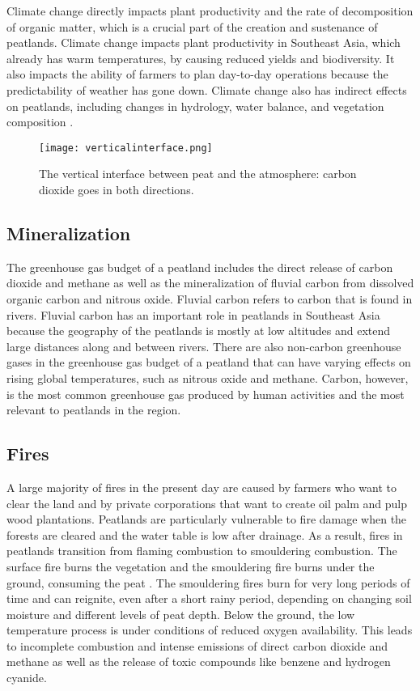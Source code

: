 Climate change directly impacts plant productivity and the rate of decomposition of organic matter, which is a crucial part of the creation and sustenance of peatlands. Climate change impacts plant productivity in Southeast Asia, which already has warm temperatures, by causing reduced yields and biodiversity. It also impacts the ability of farmers to plan day-to-day operations because the predictability of weather has gone down. Climate change also has indirect effects on peatlands, including changes in hydrology, water balance, and vegetation composition \citep{bonn2016peatland}.

\begin{figure}[!ht]
 \texttt{[image: verticalinterface.png]}
  \caption{The vertical interface between peat and the atmosphere: carbon dioxide goes in both directions.}
  \label{fig:peatlandwatertable}
\end{figure}

\subsection{Mineralization}

The greenhouse gas budget of a peatland includes the direct release of carbon dioxide and methane as well as the mineralization of fluvial carbon from dissolved organic carbon and nitrous oxide. Fluvial carbon refers to carbon that is found in rivers. Fluvial carbon has an important role in peatlands in Southeast Asia because the geography of the peatlands is mostly at low altitudes and extend large distances along and between rivers. There are also non-carbon greenhouse gases in the greenhouse gas budget of a peatland that can have varying effects on rising global temperatures, such as nitrous oxide and methane. Carbon, however, is the most common greenhouse gas produced by human activities and the most relevant to peatlands in the region.   

\subsection{Fires}

A large majority of fires in the present day are caused by farmers who want to clear the land and by private corporations that want to create oil palm and pulp wood plantations. Peatlands are particularly vulnerable to fire damage when the forests are cleared and the water table is low after drainage. As a result, fires in peatlands transition from flaming combustion to smouldering combustion. The surface fire burns the vegetation and the smouldering fire burns under the ground, consuming the peat \citep{page2016line}. The smouldering fires burn for very long periods of time and can reignite, even after a short rainy period, depending on changing soil moisture and different levels of peat depth. Below the ground, the low temperature process is under conditions of reduced oxygen availability. This leads to incomplete combustion and intense emissions of direct carbon dioxide and methane as well as the release of toxic compounds like benzene and hydrogen cyanide. 

